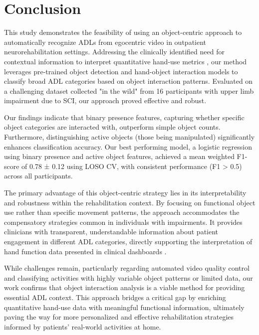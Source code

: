 \documentclass[journal,twoside,web]{ieeecolor}
\begin{document}
\section{Conclusion}
This study demonstrates the feasibility of using an object-centric approach to automatically recognize ADLs from egocentric video in outpatient neurorehabilitation settings. Addressing the clinically identified need for contextual information to interpret quantitative hand-use metrics \cite{Kadambi2024-fy}, our method leverages pre-trained object detection and hand-object interaction models to classify broad ADL categories based on object interaction patterns. Evaluated on a challenging dataset collected "in the wild" from 16 participants with upper limb impairment due to SCI, our approach proved effective and robust.

Our findings indicate that binary presence features, capturing whether specific object categories are interacted with, outperform simple object counts. Furthermore, distinguishing active objects (those being manipulated) significantly enhances classification accuracy. Our best performing model, a logistic regression using binary presence and active object features, achieved a mean weighted F1-score of 0.78 ± 0.12 using LOSO CV, with consistent performance (F1 > 0.5) across all participants.

The primary advantage of this object-centric strategy lies in its interpretability and robustness within the rehabilitation context. By focusing on functional object use rather than specific movement patterns, the approach accommodates the compensatory strategies common in individuals with impairments. It provides clinicians with transparent, understandable information about patient engagement in different ADL categories, directly supporting the interpretation of hand function data presented in clinical dashboards \cite{Kadambi2023-iv}.

While challenges remain, particularly regarding automated video quality control and classifying activities with highly variable object patterns or limited data, our work confirms that object interaction analysis is a viable method for providing essential ADL context. This approach bridges a critical gap by enriching quantitative hand-use data with meaningful functional information, ultimately paving the way for more personalized and effective rehabilitation strategies informed by patients' real-world activities at home.

\appendices


\end{document}
